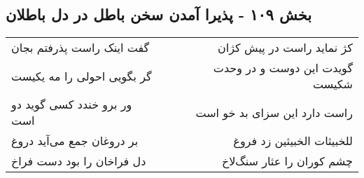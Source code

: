 \begin{center}
\section*{بخش ۱۰۹ - پذیرا آمدن سخن باطل در دل باطلان}
\label{sec:sh109}
\begin{longtable}{l p{0.5cm} r}
گفت اینک راست پذرفتم بجان
&&
کژ نماید راست در پیش کژان
\\
گر بگویی احولی را مه یکیست
&&
گویدت این دوست و در وحدت شکیست
\\
ور برو خندد کسی گوید دو است
&&
راست دارد این سزای بد خو است
\\
بر دروغان جمع می‌آید دروغ
&&
للخبیثات الخبیثین زد فروغ
\\
دل فراخان را بود دست فراخ
&&
چشم کوران را عثار سنگ‌لاخ
\\
\end{longtable}
\end{center}
